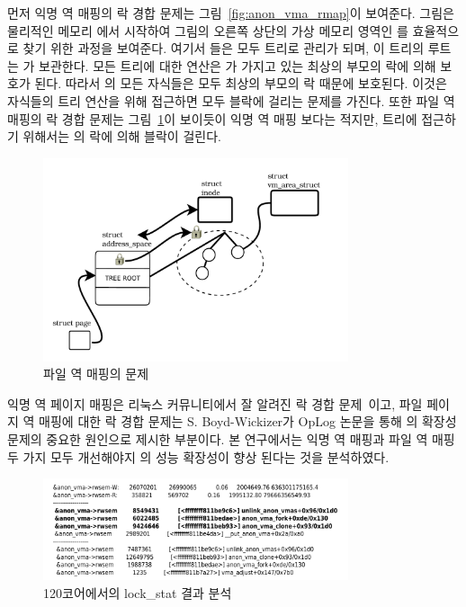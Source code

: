 먼저 익명 역 매핑의 락 경합 문제는 그림~\ref{fig:anon_vma_rmap}이 보여준다.
그림은 물리적인 메모리 에서 시작하여 그림의 오른쪽 상단의 
가상 메모리 영역인 를 효율적으로 찾기 위한 과정을 보여준다. 
여기서 들은 모두 트리로 관리가 되며, 이 트리의 루트는
가 보관한다. 
모든 트리에 대한 연산은 가 가지고 있는 최상의 부모의 락에 의해 보호가 된다. 
따라서 의 모든 자식들은 모두 최상의 부모의 락 때문에 보호된다.
이것은 자식들의 트리 연산을 위해 접근하면 모두 블락에 걸리는 문제를 가진다. 
또한 파일 역 매핑의 락 경합 문제는 그림~\ref{fig:file_rmap_default}이 보이듯이 
익명 역 매핑 보다는 적지만, 트리에 접근하기 위해서는 의 락에 의해 
블락이 걸린다.

\begin{figure}[h]
    \centering
    \includegraphics[width=0.8\textwidth]{fig/file_rmap_default}
    \caption{파일 역 매핑의 문제}
  \label{fig:file_rmap_default}
\end{figure}

익명 역 페이지 매핑은 리눅스 커뮤니티에서 잘 알려진 락 경합 문제~\cite{Andi2011adding}이고, 
파일 페이지 역 매핑에 대한 락 경합 문제는 S. Boyd-Wickizer가 OpLog 논문을 통해 의 확장성 
문제의 중요한 원인으로 제시한 부분이다.
본 연구에서는 익명 역 매핑과 파일 역 매핑 두 가지 모두 개선해야지 의 성능 확장성이 
향상 된다는 것을 분석하였다. 

\begin{figure}[h]
    \centering
    \includegraphics[width=0.8\textwidth]{fig/anon_vma_func}
    \caption{120코어에서의 lock\_stat 결과 분석}
  \label{fig:anon_vma_func}
\end{figure}

